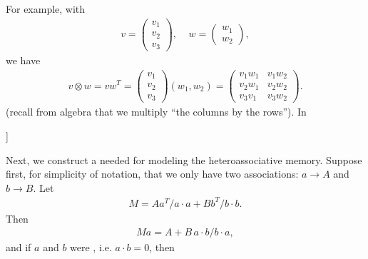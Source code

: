 \documentclass[letterpaper,10pt,english]{jupyterBook}
\begin{document}
\sphinxAtStartPar
For example, with
\begin{equation*}
\begin{split} v = \left ( \begin{array}{c} v_1 \\ v_2 \\v_3 \end{array}  \right ), \;\;\;\; w = \left ( \begin{array}{c} w_1 \\ w_2 \end{array}  \right ), \end{split}
\end{equation*}
\sphinxAtStartPar
we have
\begin{equation*}
\begin{split} 
v \otimes w = v w^T=
\left ( \begin{array}{c} v_1 \\ v_2 \\v_3 \end{array}  \right ) (w_1,w_2)
= \left ( \begin{array}{cc} v_1 w_1 & v_1 w_2 \\ v_2 w_1 & v_2 w_2 \\v_3 v_1 & v_3 w_2 \end{array}  \right ).
\end{split}
\end{equation*}
\sphinxAtStartPar
(recall from algebra that we multiply “the columns by the rows”). In 

\begin{sphinxVerbatim}[commandchars=\\\{\}]
\PYG{p}{[}\PYG{p}{]}\PYG{p}{[}\PYG{p}{]} 
\end{sphinxVerbatim}

\begin{sphinxVerbatim}[commandchars=\\\{\}]
[[ 2  7]
 [ 4 14]
 [ 6 21]]
\end{sphinxVerbatim}

\sphinxAtStartPar
Next, we construct a  needed for modeling the heteroassociative memory. Suppose first, for simplicity of notation, that we only have two associations: \(a \to A\) and \(b \to B\).
Let
\begin{equation*}
\begin{split}M = A a^T/a\cdot a + B b^T/b\cdot b.\end{split}
\end{equation*}
\sphinxAtStartPar
Then
\begin{equation*}
\begin{split}M a=  A + B \, a\cdot b /b \cdot a, \end{split}
\end{equation*}
\sphinxAtStartPar
and if \(a\) and \(b\) were , i.e. \(a \cdot b =0\), then
\end{document}
